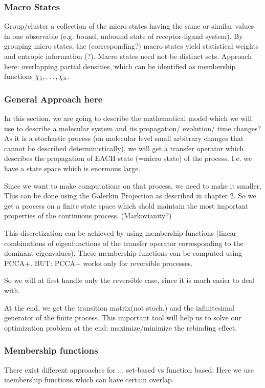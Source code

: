 \subsubsection*{Macro States}

Group/cluster a collection of the micro states having the same or similar values in one observable
(e.g. bound, unbound state of receptor-ligand system). By grouping micro states, the (corresponding?) macro states yield statistical weights and entropic information (?).
Macro states need not be distinct sets.
Approach here: overlapping partial densities, which can be identified as membership functions $\chi_1,\dots,\chi_n$.


\subsubsection*{General Approach here}
In this section, we are going to describe the mathematical model which we will use to describe a molecular system and its propagation/ evolution/ time changes?
As it is a stochastic process (on molecular level small arbitrary changes that cannot be described deterministically), we will get a transfer operator which describes the propagation of EACH state (=micro state) of the process.
I.e. we have a state space which is enormous large.

Since we want to make computations on that process, we need to make it smaller.
This can be done using the Galerkin Projection as described in chapter 2. So we get a process on a finite state space which shold maintain the most important properties of the continuous process. (Markovianity?)

This discretization can be achieved by using membership functions (linear combinations of eigenfunctions of the transfer operator corresponding to the dominant eigenvalues). These membership functions can be computed using PCCA+. BUT: PCCA+ works only for reversible processes.

So we will at first handle only the reversible case, since it is much easier to deal with.

At the end, we get the transition matrix(not stoch.) and the infinitesimal generator of the finite process.
This important tool will help us to solve our optimization problem at the end; maximize/minimize the rebinding effect.

\subsubsection*{Membership functions}
There exist different approaches for ...
set-based vs function based. Here we use membership functions which can have certain overlap.

